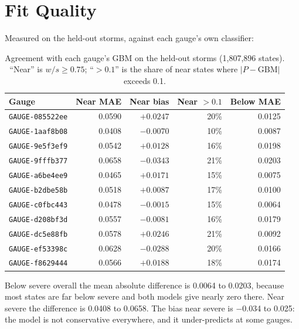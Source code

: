 \documentclass[11pt,a4paper]{article}
\newcommand{\fpNearMaeLo}{0.0408}
\newcommand{\fpNearMaeHi}{0.0658}
\newcommand{\fpNearBiasLo}{$-$0.034}
\newcommand{\fpNearBiasHi}{0.025}
\newcommand{\fpBelowMaeLo}{0.0064}
\newcommand{\fpBelowMaeHi}{0.0203}
\newcommand{\fpTestStates}{1{,}807{,}896}
\begin{document}
\section{Fit Quality}

Measured on the held-out storms, against each gauge's own classifier:

\begin{table}[ht]\centering\begin{tabular}{l|rrr|r}
Gauge & Near MAE & Near bias & Near $>0.1$ & Below MAE \\ \hline
\texttt{GAUGE-085522ee} & 0.0590 & $+0.0247$ & 20\% & 0.0125 \\
\texttt{GAUGE-1aaf8b08} & 0.0408 & $-0.0070$ & 10\% & 0.0087 \\
\texttt{GAUGE-9e5f3ef9} & 0.0542 & $+0.0128$ & 16\% & 0.0198 \\
\texttt{GAUGE-9fffb377} & 0.0658 & $-0.0343$ & 21\% & 0.0203 \\
\texttt{GAUGE-a6be4ee9} & 0.0465 & $+0.0171$ & 15\% & 0.0075 \\
\texttt{GAUGE-b2dbe58b} & 0.0518 & $+0.0087$ & 17\% & 0.0100 \\
\texttt{GAUGE-c0fbc443} & 0.0478 & $-0.0015$ & 15\% & 0.0064 \\
\texttt{GAUGE-d208bf3d} & 0.0557 & $-0.0081$ & 16\% & 0.0179 \\
\texttt{GAUGE-dc5e88fb} & 0.0578 & $+0.0246$ & 21\% & 0.0092 \\
\texttt{GAUGE-ef53398c} & 0.0628 & $-0.0288$ & 20\% & 0.0166 \\
\texttt{GAUGE-f8629444} & 0.0566 & $+0.0188$ & 18\% & 0.0174 \\
\end{tabular}\caption{Agreement with each gauge's GBM on the held-out storms (\fpTestStates{} states). ``Near'' is $w/s\ge 0.75$; ``$>0.1$'' is the share of near states where $|P-\mathrm{GBM}|$ exceeds 0.1.}\label{tab:fit}\end{table}

Below severe overall the mean absolute difference is \fpBelowMaeLo{} to
\fpBelowMaeHi{}, because most states are far below severe and both models give
nearly zero there. Near severe the difference is \fpNearMaeLo{} to \fpNearMaeHi{}. The
bias near severe is \fpNearBiasLo{} to \fpNearBiasHi{}: the model is not conservative
everywhere, and it under-predicts at some gauges.
\end{document}
